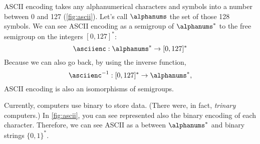 \begin{example}
  ASCII encoding takes any alphanumerical characters and symbols into a number between 0 and 127 (\cref{fig:ascii}).
  Let's call $\alphanums$ the set of those 128 symbols.
  We can see ASCII encoding as a semigroup \whomo of $\alphanums^*$ to the free semigroup on the integers $[0,127]^*$:
  \begin{equation}
    \label{eq:ASCII-semi}
    \asciienc: \alphanums^* \to  [0,127]^*
  \end{equation}
  Because we can also go back, by using the inverse function,
  \begin{equation}
    \label{eq:ASCII-semi-inv}
    \asciienc^{-1}:  [0,127]^*  \to  \alphanums^*,
  \end{equation}
  ASCII encoding is also an isomorphisms of semigroups.


\end{example}
\begin{example}
  Currently, computers use binary to store data. (There were, in fact, \emph{trinary} computers.)
  In \cref{fig:ascii}, you can see represented also the binary encoding of each character.
  Therefore, we can see ASCII as a \whomo between $\alphanums^*$ and binary strings $\{0,1\}^*$.
\end{example}

